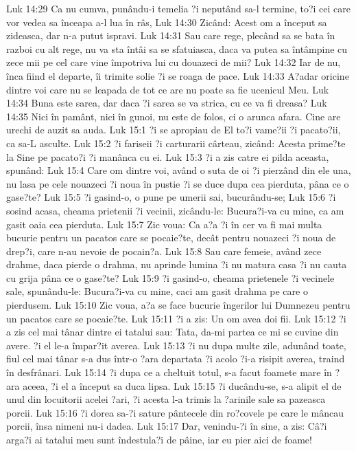 Luk 14:29  Ca nu cumva, punându-i temelia ?i neputând sa-l termine, to?i cei care vor vedea sa înceapa a-l lua în râs,
Luk 14:30  Zicând: Acest om a început sa zideasca, dar n-a putut ispravi.
Luk 14:31  Sau care rege, plecând sa se bata în razboi cu alt rege, nu va sta întâi sa se sfatuiasca, daca va putea sa întâmpine cu zece mii pe cel care vine împotriva lui cu douazeci de mii?
Luk 14:32  Iar de nu, înca fiind el departe, îi trimite solie ?i se roaga de pace.
Luk 14:33  A?adar oricine dintre voi care nu se leapada de tot ce are nu poate sa fie ucenicul Meu.
Luk 14:34  Buna este sarea, dar daca ?i sarea se va strica, cu ce va fi dreasa?
Luk 14:35  Nici în pamânt, nici în gunoi, nu este de folos, ci o arunca afara. Cine are urechi de auzit sa auda.
Luk 15:1  ?i se apropiau de El to?i vame?ii ?i pacato?ii, ca sa-L asculte.
Luk 15:2  ?i fariseii ?i carturarii cârteau, zicând: Acesta prime?te la Sine pe pacato?i ?i manânca cu ei.
Luk 15:3  ?i a zis catre ei pilda aceasta, spunând:
Luk 15:4  Care om dintre voi, având o suta de oi ?i pierzând din ele una, nu lasa pe cele nouazeci ?i noua în pustie ?i se duce dupa cea pierduta, pâna ce o gase?te?
Luk 15:5  ?i gasind-o, o pune pe umerii sai, bucurându-se;
Luk 15:6  ?i sosind acasa, cheama prietenii ?i vecinii, zicându-le: Bucura?i-va cu mine, ca am gasit oaia cea pierduta.
Luk 15:7  Zic voua: Ca a?a ?i în cer va fi mai multa bucurie pentru un pacatos care se pocaie?te, decât pentru nouazeci ?i noua de drep?i, care n-au nevoie de pocain?a.
Luk 15:8  Sau care femeie, având zece drahme, daca pierde o drahma, nu aprinde lumina ?i nu matura casa ?i nu cauta cu grija pâna ce o gase?te?
Luk 15:9  ?i gasind-o, cheama prietenele ?i vecinele sale, spunându-le: Bucura?i-va cu mine, caci am gasit drahma pe care o pierdusem.
Luk 15:10  Zic voua, a?a se face bucurie îngerilor lui Dumnezeu pentru un pacatos care se pocaie?te.
Luk 15:11  ?i a zis: Un om avea doi fii.
Luk 15:12  ?i a zis cel mai tânar dintre ei tatalui sau: Tata, da-mi partea ce mi se cuvine din avere. ?i el le-a împar?it averea.
Luk 15:13  ?i nu dupa multe zile, adunând toate, fiul cel mai tânar s-a dus într-o ?ara departata ?i acolo ?i-a risipit averea, traind în desfrânari.
Luk 15:14  ?i dupa ce a cheltuit totul, s-a facut foamete mare în ?ara aceea, ?i el a început sa duca lipsa.
Luk 15:15  ?i ducându-se, s-a alipit el de unul din locuitorii acelei ?ari, ?i acesta l-a trimis la ?arinile sale sa pazeasca porcii.
Luk 15:16  ?i dorea sa-?i sature pântecele din ro?covele pe care le mâncau porcii, însa nimeni nu-i dadea.
Luk 15:17  Dar, venindu-?i în sine, a zis: Câ?i arga?i ai tatalui meu sunt îndestula?i de pâine, iar eu pier aici de foame!

